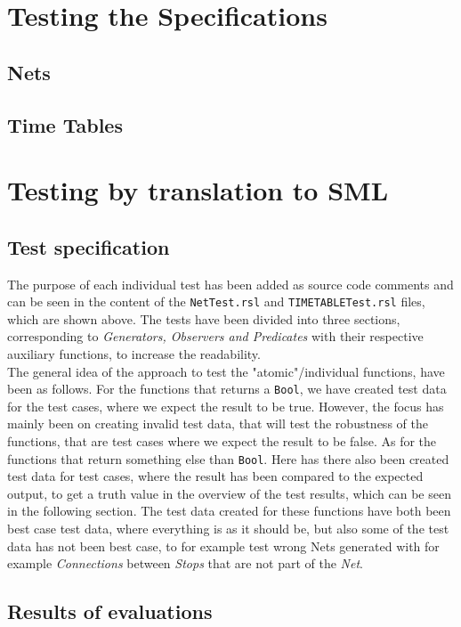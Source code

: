 \documentclass[a4]{article}
\begin{document}
\section{Testing the Specifications}

\subsection{Nets}



\subsection{Time Tables}



\section{Testing by translation to SML}

\subsection{Test specification}

The purpose of each individual test has been added as source code comments and can be seen in the content of the \verb=NetTest.rsl=  and \verb=TIMETABLETest.rsl= files, which are shown above. The tests have been divided into three sections, corresponding to \emph{Generators, Observers and Predicates} with their respective auxiliary functions, to increase the readability. \\

The general idea of the approach to test the "atomic"/individual functions, have been as follows. For the functions that returns a \verb=Bool=, we have created test data for the test cases, where we expect the result to be true. However, the focus has mainly been on creating invalid test data, that will test the robustness of the functions, that are test cases where we expect the result to be false. As for the functions that return something else than \verb=Bool=. Here has there also been created test data for test cases, where the result has been compared to the expected output, to get a truth value in the overview of the test results, which can be seen in the following section. The test data created for these functions have both been best case test data, where everything is as it should be, but also some of the test data has not been best case, to for example test wrong Nets generated with for example \emph{Connections} between \emph{Stops} that are not part of the \emph{Net}.


\subsection{Results of evaluations}
\end{document}
